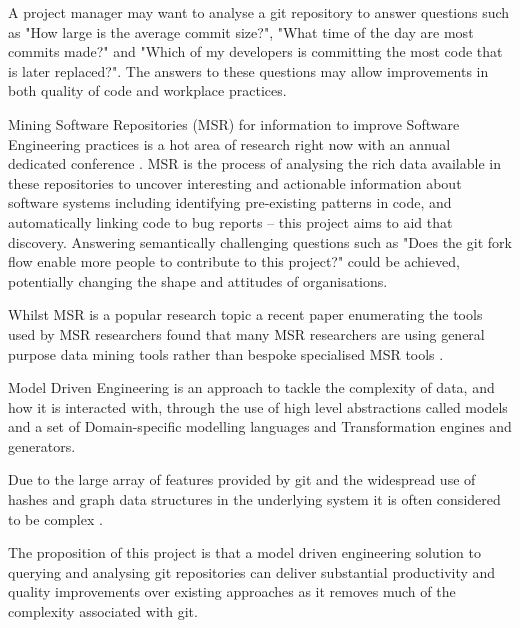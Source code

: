 \documentclass[11pt]{book}
\begin{document}
A project manager may want to analyse a git repository to answer questions such as "How large is the average commit size?", "What time of the day are most commits made?" and "Which of my developers is committing the most code that is later replaced?". The answers to these questions may allow improvements in both quality of code and workplace practices.

Mining Software Repositories (MSR) for information to improve Software Engineering practices is a hot area of research right now with an annual dedicated conference \cite{msr2015}. MSR is the process of analysing the rich data available in these repositories to uncover interesting and actionable information about software systems \cite{theroadagainformsr} including identifying pre-existing patterns in code, and automatically linking code to bug reports -- this project aims to aid that discovery. Answering semantically challenging questions such as "Does the git fork flow enable more people to contribute to this project?" could be achieved, potentially changing the shape and attitudes of organisations.

Whilst MSR is a popular research topic a recent paper enumerating the tools used by MSR researchers found that many MSR researchers are using general purpose data mining tools rather than bespoke specialised MSR tools \cite{toolsinminingsoftwarerepositories}.

Model Driven Engineering is an approach to tackle the complexity of data, and how it is interacted with, through the use of high level abstractions called models \cite{modeldrivenengineering} and a set of Domain-specific modelling languages and Transformation engines and generators.   
	
Due to the large array of features provided by git and the widespread use of hashes and graph data structures in the underlying system it is often considered to be complex \cite{gitcomplex}\cite{githard}\cite{gitmixedmetaphors}.

The proposition of this project is that a model driven engineering solution to querying and analysing git repositories can deliver substantial productivity and quality improvements over existing approaches as it removes much of the complexity associated with git.

\end{document}
